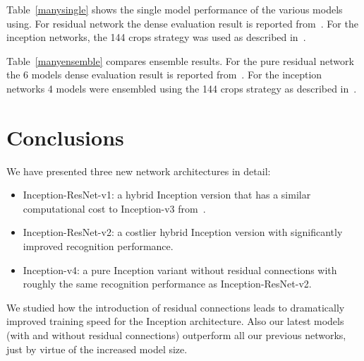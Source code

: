\documentclass[10pt,twocolumn,letterpaper]{article}
\begin{document}
Table~\ref{manysingle} shows the single model performance of the various
models using. For residual network the dense evaluation result is reported
from~\cite{he2015deep}. For the inception networks, the 144 crops strategy
was used as described in~\cite{szegedy2015going}.

Table~\ref{manyensemble} compares ensemble results. For the pure residual
network the 6 models dense evaluation result is reported
from~\cite{he2015deep}. For the inception networks 4 models were ensembled
using the 144 crops strategy as described in~\cite{szegedy2015going}.

\section{Conclusions}

We have presented three new network architectures in detail:

\begin{itemize}
  \item Inception-ResNet-v1: a hybrid Inception version that has a
    similar computational cost to Inception-v3
    from~\cite{szegedy2015rethinking}.
  \item Inception-ResNet-v2: a costlier hybrid Inception version with
    significantly improved recognition performance.
  \item Inception-v4: a pure Inception variant without residual connections
    with roughly the same recognition performance as Inception-ResNet-v2.
\end{itemize}

We studied how the introduction of residual connections leads to dramatically
improved training speed for the Inception architecture. Also our latest models
(with and without residual connections) outperform all our previous networks,
just by virtue of the increased model size.

%
%
%
%
%
%
%
%
%


{\small


}
\end{document}
